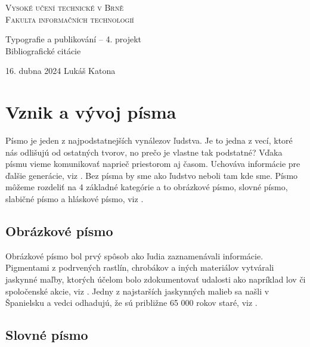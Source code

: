 \documentclass[11pt, a4paper]{article}
\begin{document}
\begin{titlepage}
    \begin{center}
        \textsc{\Huge Vysoké učení technické v Brně\\\vspace{0.5em}\huge Fakulta informačních technologií}
        
        {\LARGE Typografie a publikování -- 4. projekt\\\vspace{0.5em}}
        {\Huge Bibliografické citácie}
        
    \end{center}
    {\Large 16. dubna 2024 \hfill Lukáš Katona}
\end{titlepage}

\newpage

\section{Vznik a vývoj písma}

Písmo je jeden z najpodstatnejších vynálezov ľudstva. Je to jedna z vecí, ktoré nás odlišujú od ostatných tvorov, no prečo je vlastne tak podstatné?
Vďaka písmu vieme komunikovať naprieč priestorom aj časom. Uchováva informácie pre ďalšie generácie, viz \cite{Balko}. Bez písma by sme ako ľudstvo neboli tam kde sme. Písmo môžeme rozdeliť na 4 základné kategórie a to obrázkové písmo, slovné písmo, slabičné písmo a hláskové písmo, viz \cite{gelb1963study}.

\subsection{Obrázkové písmo}

Obrázkové písmo bol prvý spôsob ako ľudia zaznamenávali informácie. Pigmentami z podrvených rastlín, chrobákov a iných materiálov vytvárali jaskynné maľby, ktorých účelom bolo zdokumentovať udalosti ako napríklad lov či spoločenské akcie, viz \cite{clottes2016paleolithic}. Jedny z najstarších jaskynných malieb sa našli v Španielsku a vedci odhadujú, že sú približne 65 000 rokov staré, viz \cite{Greshko_2018}.

\subsection{Slovné písmo}
\end{document}
